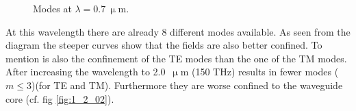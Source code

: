 \begin{figure}[h]
\caption{Modes at $\lambda = 0.7~\upmu$m.}%
\label{fig:1_0307}%
\end{figure}

At this wavelength there are already 8 different modes available. As seen from the diagram the steeper curves show that the fields are also better confined. To mention is also the confinement of the TE modes than the one of the TM modes.
After increasing the wavelength to 2.0~$\upmu$m (150 THz) results in fewer modes ($m \leq 3$)(for TE and TM). Furthermore they are worse confined to the waveguide core (cf. fig \ref{fig:1_2_02}).



